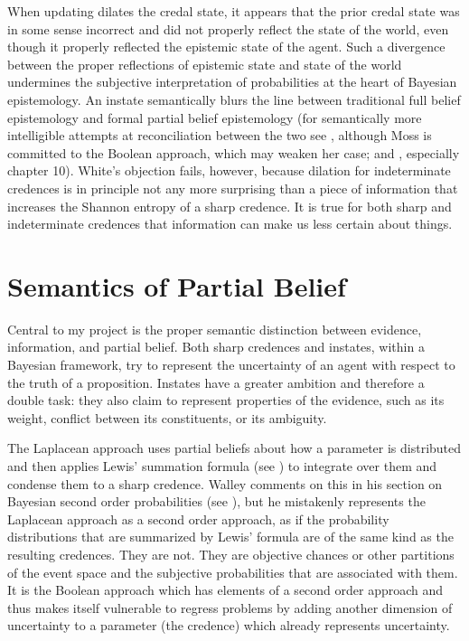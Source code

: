 \documentclass[11pt]{article}
\begin{document}
When updating dilates the credal state, it appears that the prior
credal state was in some sense incorrect and did not properly reflect
the state of the world, even though it properly reflected the
epistemic state of the agent. Such a divergence between the proper
reflections of epistemic state and state of the world undermines the
subjective interpretation of probabilities at the heart of Bayesian
epistemology. An instate semantically blurs the line between
traditional full belief epistemology and formal partial belief
epistemology (for semantically more intelligible attempts at
reconciliation between the two see , although Moss
is committed to the Boolean approach, which may weaken her case; and
, especially chapter 10). White's objection fails,
however, because dilation for indeterminate credences is in principle
not any more surprising than a piece of information that increases the
Shannon entropy of a sharp credence. It is true for both sharp and
indeterminate credences that information can make us less certain
about things.

\section{Semantics of Partial Belief}
\label{SemanticsOfPartialBelief}
Central to my project is the proper semantic distinction between
evidence, information, and partial belief. Both sharp credences and
instates, within a Bayesian framework, try to represent the
uncertainty of an agent with respect to the truth of a proposition.
Instates have a greater ambition and therefore a double task: they
also claim to represent properties of the evidence, such as its
weight, conflict between its constituents, or its ambiguity.

The Laplacean approach uses partial beliefs about how a parameter is
distributed and then applies Lewis' summation formula (see
) to integrate over them and condense them to
a sharp credence. Walley comments on this  in his
section on Bayesian second order probabilities (see
), but he mistakenly represents the Laplacean
approach as a second order approach, as if the probability
distributions that are summarized by Lewis' formula are of the same
kind as the resulting credences. They are not. They are objective
chances or other partitions of the event space and the subjective
probabilities that are associated with them. It is the Boolean
approach which has elements of a second order approach and thus makes
itself vulnerable to regress problems by adding another dimension of
uncertainty to a parameter (the credence) which already represents
uncertainty.
\end{document}
